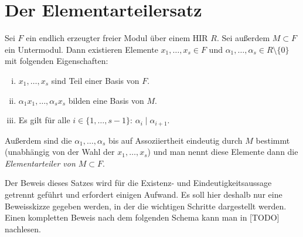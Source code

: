 
\chapter{Der Elementarteilersatz}
\begin{thSatz}[Elementarteilersatz]
    Sei $F$ ein endlich erzeugter freier Modul über einem HIR $R$. Sei außerdem
    $M\subset F$ ein Untermodul. Dann existieren Elemente $x_1,\ldots,x_s\in F$
    und $\alpha_1,\ldots,\alpha_s\in R\setminus\{0\}$ mit folgenden
    Eigenschaften:
    \begin{enumerate}[i)]
        \item
            $x_1,\ldots,x_s$ sind Teil einer Basis von $F$.
        \item
            $\alpha_1 x_1, \ldots, \alpha_s x_s$ bilden eine Basis von $M$.
        \item
            Es gilt für alle $i\in\{1,\ldots,s-1\}$:\; $\alpha_i\mid\alpha_{i+1}$.
    \end{enumerate}
    Außerdem sind die $\alpha_1,\ldots,\alpha_s$ bis auf Assoziiertheit
    eindeutig durch $M$ bestimmt (unabhängig von der Wahl der $x_1,\ldots,x_s$)
    und man nennt diese Elemente dann die \emph{Elementarteiler von 
    $M\subset F$}.
\end{thSatz}

Der Beweis dieses Satzes wird für die Existenz- und Eindeutigkeitsaussage
getrennt geführt und erfordert einigen Aufwand. Es soll hier deshalb nur eine
Beweisskizze gegeben werden, in der die wichtigen Schritte dargestellt werden.
Einen kompletten Beweis nach dem folgenden Schema kann man in 
[TODO]
nachlesen.

